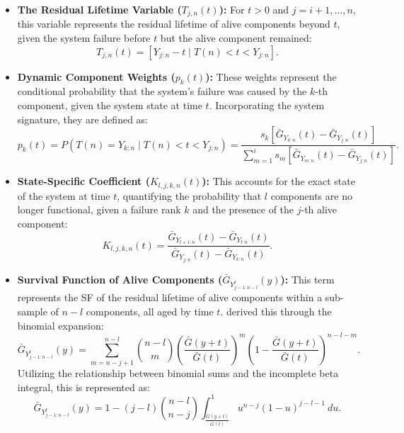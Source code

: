 \documentclass[twoside]{article}
\begin{document}
\begin{itemize}
    \item \textbf{The Residual Lifetime Variable ($T_{j,n}(t)$):} For $t>0$ and $j=i+1, \ldots, n$, this variable represents the residual lifetime of alive components beyond $t$, given the system failure before $t$ but the alive component remained:
    \begin{equation}
    T_{j,n}(t) = [Y_{j:n} - t \mid T(n) < t < Y_{j:n}].
    \end{equation}

    \item \textbf{Dynamic Component Weights ($p_k(t)$):} These weights represent the conditional probability that the system's failure was caused by the $k$-th component, given the system state at time $t$. Incorporating the system signature, they are defined as:
    \begin{equation}\label{pk}
    p_k(t) = P(T(n) = Y_{k:n} \mid T(n) < t < Y_{j:n}) = \frac{s_k [ \bar{G}_{Y_{k:n}}(t) - \bar{G}_{Y_{j:n}}(t) ] }{ \sum_{m=1}^i s_m [ \bar{G}_{Y_{m:n}}(t) - \bar{G}_{Y_{j:n}}(t) ] }.
    \end{equation}

    \item \textbf{State-Specific Coefficient ($K_{l,j,k,n}(t)$):} This accounts for the exact state of the system at time $t$, quantifying the probability that $l$ components are no longer functional, given a failure rank $k$ and the presence of the $j$-th alive component:
    \begin{equation}\label{kl}
    K_{l,j,k,n}(t) = \frac{ \bar{G}_{Y_{l+1:n}}(t) - \bar{G}_{Y_{l:n}}(t) }
    { \bar{G}_{Y_{j:n}}(t) - \bar{G}_{Y_{k:n}}(t)}.
    \end{equation}

    \item \textbf{Survival Function of Alive Components ($\bar{G}_{Y^t_{j-1:n-l}}(y)$):} This term represents the SF of the residual lifetime of alive components within a sub-sample of $n-l$ components, all aged by time $t$. \cite{GoliforushaniAsadiBalakrishnan:2012} derived this through the binomial expansion:
    \begin{equation}\label{eq_binom_sum}
    \bar{G}_{Y^t_{j-1:n-l}}(y) = \sum\limits_{m=n-j+1}^{n-l} \binom{n-l}{m} \left( \frac{\bar{G}(y+t)}{\bar{G}(t)} \right)^{m} \left( 1 - \frac{\bar{G}(y+t)}{\bar{G}(t)} \right)^{n-l-m}.
    \end{equation}
    Utilizing the relationship between binomial sums and the incomplete beta integral, this is represented as:
    \begin{equation}\label{eq_beta_int}
    \bar{G}_{Y^t_{j-1:n-l}}(y) = 1-(j-l)\binom{n-l}{n-j}\int_{\frac{\bar{G}(y+t)}{\bar{G}(t)}}^{1}u^{n-j}(1-u)^{j-l-1}~du.
    \end{equation}
\end{itemize}
\end{document}
